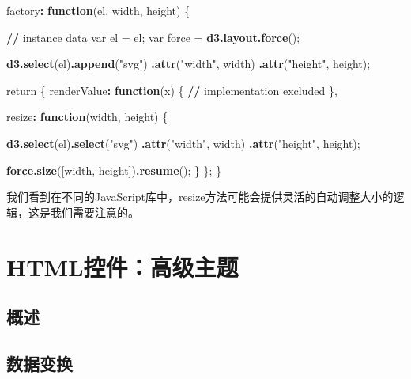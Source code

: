 \documentclass[]{book}
\newenvironment{Shaded}{\begin{snugshade}}{\end{snugshade}}
\newcommand{\KeywordTok}[1]{\textcolor[rgb]{0.13,0.29,0.53}{\textbf{#1}}}
\newcommand{\StringTok}[1]{\textcolor[rgb]{0.31,0.60,0.02}{#1}}
\newcommand{\ControlFlowTok}[1]{\textcolor[rgb]{0.13,0.29,0.53}{\textbf{#1}}}
\newcommand{\OperatorTok}[1]{\textcolor[rgb]{0.81,0.36,0.00}{\textbf{#1}}}
\newcommand{\ErrorTok}[1]{\textcolor[rgb]{0.64,0.00,0.00}{\textbf{#1}}}
\newcommand{\NormalTok}[1]{#1}
\theoremstyle{definition}
\theoremstyle{definition}
\theoremstyle{definition}
\theoremstyle{remark}
\begin{document}
\begin{Shaded}
\begin{Highlighting}[]
\NormalTok{factory}\OperatorTok{:}\StringTok{ }\ControlFlowTok{function}\NormalTok{(el, width, height) \{}

  \OperatorTok{/}\ErrorTok{/}\StringTok{ }\NormalTok{instance data}
\NormalTok{  var el =}\StringTok{ }\NormalTok{el;}
\NormalTok{  var force =}\StringTok{ }\KeywordTok{d3.layout.force}\NormalTok{();}

  \KeywordTok{d3.select}\NormalTok{(el)}\KeywordTok{.append}\NormalTok{(}\StringTok{"svg"}\NormalTok{)}
    \KeywordTok{.attr}\NormalTok{(}\StringTok{"width"}\NormalTok{, width)}
    \KeywordTok{.attr}\NormalTok{(}\StringTok{"height"}\NormalTok{, height);}
      
\NormalTok{  return \{}
\NormalTok{    renderValue}\OperatorTok{:}\StringTok{ }\ControlFlowTok{function}\NormalTok{(x) \{}
      \OperatorTok{/}\ErrorTok{/}\StringTok{ }\NormalTok{implementation excluded}
\NormalTok{    \},}
      
\NormalTok{    resize}\OperatorTok{:}\StringTok{ }\ControlFlowTok{function}\NormalTok{(width, height) \{}
         
      \KeywordTok{d3.select}\NormalTok{(el)}\KeywordTok{.select}\NormalTok{(}\StringTok{"svg"}\NormalTok{)}
        \KeywordTok{.attr}\NormalTok{(}\StringTok{"width"}\NormalTok{, width)}
        \KeywordTok{.attr}\NormalTok{(}\StringTok{"height"}\NormalTok{, height);}

      \KeywordTok{force.size}\NormalTok{([width, height])}\KeywordTok{.resume}\NormalTok{();}
\NormalTok{    \}}
\NormalTok{  \};}
\NormalTok{\}}
\end{Highlighting}
\end{Shaded}

我们看到在不同的JavaScript库中，resize方法可能会提供灵活的自动调整大小的逻辑，这是我们需要注意的。

\chapter{HTML控件：高级主题}\label{htmlwidgets-advanced}

\section{概述}\label{-1}

\section{数据变换}
\end{document}

